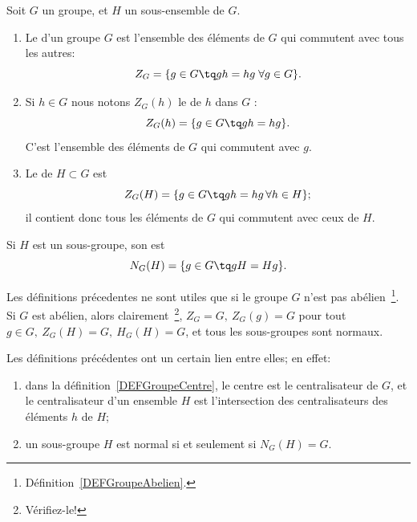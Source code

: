 \begin{definition}\label{defGroupeCentre}
Soit \( G\) un groupe, et \( H\) un sous-ensemble de \( G \).
\begin{enumerate}
\item
Le  d'un groupe \( G\) est l'ensemble des éléments de \( G\) qui commutent avec tous les autres:
\begin{equation}
    Z_G=\{ g\in G\tq gh=hg\;\forall g\in G \}.
\end{equation}

\item
Si \( h\in G\) nous notons \( Z_G(h)\) le  de \( h\) dans \( G\) :
\begin{equation}
    Z_G(h)=\{g\in G\tq gh = hg\}.
\end{equation}
C'est l'ensemble des éléments de \( G\) qui commutent avec \( g\).

\item    Le  de \( H\subset G\) est
    \begin{equation}
        Z_G(H)=\{ g\in G\tq gh=hg\,\forall h\in H\};
    \end{equation}
    il contient donc tous les éléments de \( G\) qui commutent avec ceux de \( H\).
\end{enumerate}
\end{definition}

\begin{definition}\label{DEFGroupeNormalisateur}
        Si \( H\) est un sous-groupe, son  est
    \begin{equation}
        N_G(H)=\{ g\in G\tq gH=Hg \}.
    \end{equation}
\end{definition}

\begin{remark}
Les définitions précedentes ne sont utiles que si le groupe \(G \) n'est pas abélien~\footnote{Définition~\ref{DEFGroupeAbelien}.}. Si \( G \) est abélien, alors clairement~\footnote{Vérifiez-le!}, \(Z_G = G,\ Z_G(g) = G\) pour tout \(g \in G,\ Z_G(H) = G,\ H_G(H) = G\), et tous les sous-groupes sont normaux.
\end{remark}

\begin{remark}
Les définitions précédentes ont un certain lien entre elles; en effet:
  \begin{enumerate}
    \item dans la définition~\ref{DEFGroupeCentre}, le centre est le centralisateur de \(G \), et le centralisateur d'un ensemble \( H \) est l'intersection des centralisateurs des éléments \( h \) de \( H \);
    \item un sous-groupe \( H \) est normal si et seulement si \( N_G(H) = G \).
  \end{enumerate}
\end{remark}


